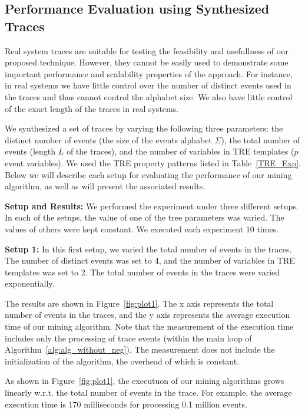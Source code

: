 \documentclass[]{sigplanconf}
\begin{document}
\subsection{Performance Evaluation using Synthesized Traces}

Real system traces are suitable for testing the feasibility and usefullness of our proposed technique. However, they cannot be easily used to demonstrate some important performance and scalability properties of the approach. For instance, in real systems we have little control over the number of distinct events used in the traces and thus cannot control the alphabet size. We also have little control of the exact length of the traces in real systems.


We synthesized a set of traces by varying the following three parameters: the distinct number of events (the size of the events alphabet $\Sigma$), the total number of events (length $L$ of the traces), and the number of variables in TRE templates ($p$ event variables). We used the TRE property patterns listed in Table~\ref{TRE_Exp}.
Below we will describe each setup for evaluating the performance of our mining algorithm, as well as will present the associated results.

\vspace{3mm}

\noindent \textbf{Setup and Results:} We performed the experiment under three different setups. In each of the setups, the value of one of the tree parameters was varied. The values of others were kept constant. We executed each experiment 10 times.


\vspace{3mm}

\noindent \textbf{Setup 1:}
In this first setup, we varied the total number of events in the traces. The number of distinct events was set to 4, and the number of variables in TRE templates was set to 2. The total number of events in the traces were varied exponentially.

The results are shown in Figure~\ref{fig:plot1}. The x axis represents the total number of events in the traces, and the y axis represents the average execution time of our mining algorithm. Note that the measurement of the execution time includes only the processing of trace events (within the main loop of Algorithm~\ref{alg:alg_without_neg}). The measurement does not include the initialization of the algorithm, the overhead of which is constant.

As shown in Figure~\ref{fig:plot1}, the executuon of our mining algorithms grows linearly w.r.t. the total number of events in the trace. For example, the average execution time is 170 milliseconds for processing 0.1 million events.
\end{document}
